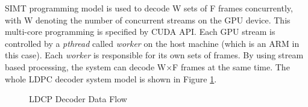 \documentclass[conference]{IEEEtran}
\begin{document}
SIMT programming model is used to decode W sets of F frames concurrently, with W denoting the number of concurrent streams on the GPU device. This multi-core programming is specified by CUDA API. Each GPU stream is controlled by a \textit{pthread} called \textit{worker} on the host machine (which is an ARM in this case). Each \textit{worker} is responsible for its own sets of frames. By using stream based processing, the system can decode W$\times$F frames at the same time. The whole LDPC decoder system model is shown in Figure \ref{fig_total}.

\begin{figure}[h]
\begin{centering}
\caption[width=.3\textwidth]{LDCP Decoder Data Flow}
\label{fig_total}
\end{centering}
\end{figure}
\end{document}
